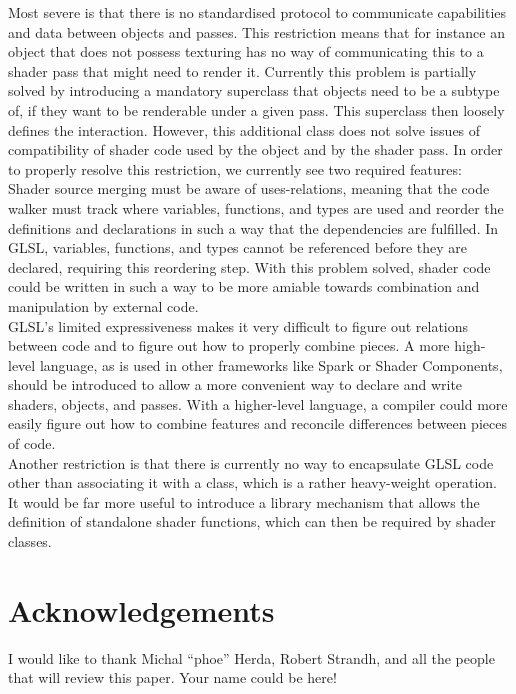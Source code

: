 \documentclass[format=sigconf]{acmart}
\begin{document}
Most severe is that there is no standardised protocol to communicate capabilities and data between objects and passes. This restriction means that for instance an object that does not possess texturing has no way of communicating this to a shader pass that might need to render it. Currently this problem is partially solved by introducing a mandatory superclass that objects need to be a subtype of, if they want to be renderable under a given pass. This superclass then loosely defines the interaction. However, this additional class does not solve issues of compatibility of shader code used by the object and by the shader pass. In order to properly resolve this restriction, we currently see two required features: \\

Shader source merging must be aware of uses-relations, meaning that the code walker must track where variables, functions, and types are used and reorder the definitions and declarations in such a way that the dependencies are fulfilled. In GLSL, variables, functions, and types cannot be referenced before they are declared, requiring this reordering step. With this problem solved, shader code could be written in such a way to be more amiable towards combination and manipulation by external code. \\

GLSL's limited expressiveness makes it very difficult to figure out relations between code and to figure out how to properly combine pieces. A more high-level language, as is used in other frameworks like Spark\cite{spark} or Shader Components\cite{components}, should be introduced to allow a more convenient way to declare and write shaders, objects, and passes. With a higher-level language, a compiler could more easily figure out how to combine features and reconcile differences between pieces of code. \\

Another restriction is that there is currently no way to encapsulate GLSL code other than associating it with a class, which is a rather heavy-weight operation. It would be far more useful to introduce a library mechanism that allows the definition of standalone shader functions, which can then be required by shader classes.

\section{Acknowledgements}\label{acknowledgements}
I would like to thank Michal ``phoe'' Herda, Robert Strandh, and all the people that will review this paper. Your name could be here!
\end{document}
